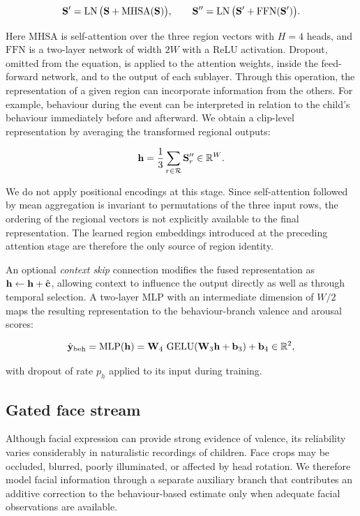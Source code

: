 \begin{equation}
  \mathbf{S}' = \operatorname{LN}\big(\mathbf{S} + \mathrm{MHSA}(\mathbf{S})\big),
  \qquad
  \mathbf{S}'' = \operatorname{LN}\big(\mathbf{S}' + \mathrm{FFN}(\mathbf{S}')\big).
\end{equation}

Here $\mathrm{MHSA}$ is self-attention over the three region vectors with $H=4$ heads, and $\mathrm{FFN}$ is a two-layer network of width $2W$ with a ReLU activation. Dropout, omitted from the equation, is applied to the attention weights, inside the feed-forward network, and to the output of each sublayer. Through this operation, the representation of a given region can incorporate information from the others. For example, behaviour during the event can be interpreted in relation to the child's behaviour immediately before and afterward. We obtain a clip-level representation by averaging the transformed regional outputs:

\begin{equation}
  \mathbf{h} = \frac{1}{3}\sum_{r\in\mathcal{R}}\mathbf{S}''_r\in\mathbb{R}^{W}.
\end{equation}

We do not apply positional encodings at this stage. Since self-attention followed by mean aggregation is invariant to permutations of the three input rows, the ordering of the regional vectors is not explicitly available to the final representation. The learned region embeddings introduced at the preceding attention stage are therefore the only source of region identity.

An optional \emph{context skip} connection modifies the fused representation as $\mathbf{h}\leftarrow\mathbf{h}+\hat{\mathbf{c}}$, allowing context to influence the output directly as well as through temporal selection. A two-layer MLP with an intermediate dimension of $W/2$ maps the resulting representation to the behaviour-branch valence and arousal scores:

\begin{equation}
  \hat{\mathbf{y}}_{\text{beh}} = \mathrm{MLP}(\mathbf{h}) = \mathbf{W}_4\,\operatorname{GELU}(\mathbf{W}_3\mathbf{h}+\mathbf{b}_3)+\mathbf{b}_4\in\mathbb{R}^{2},
\end{equation}

with dropout of rate $p_h$ applied to its input during training.

\subsection{Gated face stream}
\label{sec:face}

Although facial expression can provide strong evidence of valence, its reliability varies considerably in naturalistic recordings of children. Face crops may be occluded, blurred, poorly illuminated, or affected by head rotation. We therefore model facial information through a separate auxiliary branch that contributes an additive correction to the behaviour-based estimate only when adequate facial observations are available.

